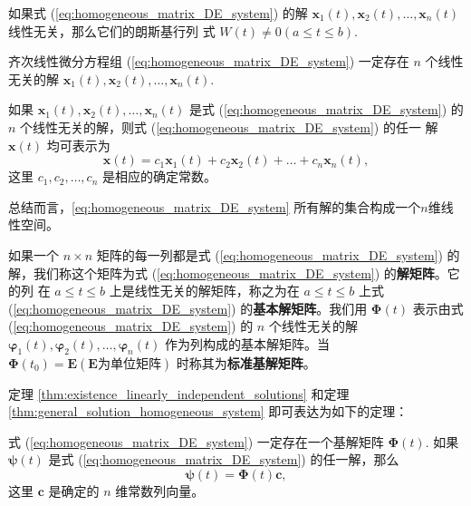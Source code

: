 \begin{theorem}[朗斯基行列式与向量函数线性无关性]\label{thm:Wronskian_linear_independence_vector}
如果式 (\ref{eq:homogeneous_matrix_DE_system}) 的解 $\mathbf{x}_1(t), \mathbf{x}_2(t), \dots, \mathbf{x}_n(t)$ 线性无关，那么它们的朗斯基行列
式 $W(t) \ne 0 (a \le t \le b)$.
\end{theorem}

\begin{theorem}[线性无关解的存在性]\label{thm:existence_linearly_independent_solutions}
齐次线性微分方程组 (\ref{eq:homogeneous_matrix_DE_system}) 一定存在 $n$ 个线性无关的解 $\mathbf{x}_1(t), \mathbf{x}_2(t), \dots,
\mathbf{x}_n(t)$.
\end{theorem}

\begin{theorem}[齐次方程组通解结构]\label{thm:general_solution_homogeneous_system}
如果 $\mathbf{x}_1(t), \mathbf{x}_2(t), \dots, \mathbf{x}_n(t)$ 是式 (\ref{eq:homogeneous_matrix_DE_system}) 的 $n$ 个线性无关的解，则式 (\ref{eq:homogeneous_matrix_DE_system}) 的任一
解 $\mathbf{x}(t)$ 均可表示为
$$\mathbf{x}(t) = c_1\mathbf{x}_1(t)+c_2\mathbf{x}_2(t)+\dots+c_n\mathbf{x}_n(t),$$
这里 $c_1, c_2, \dots, c_n$ 是相应的确定常数。
\end{theorem}
\begin{remark}
    总结而言，\eqref{eq:homogeneous_matrix_DE_system} 所有解的集合构成一个$n$维线性空间。
\end{remark}

\begin{definition}[解矩阵]\label{def:解矩阵}
    如果一个 $n \times n$ 矩阵的每一列都是式 (\ref{eq:homogeneous_matrix_DE_system}) 的解，我们称这个矩阵为式 (\ref{eq:homogeneous_matrix_DE_system}) 的\textbf{解矩阵}。它 的列
在 $a \le t \le b$ 上是线性无关的解矩阵，称之为在 $a \le t \le b$ 上式 (\ref{eq:homogeneous_matrix_DE_system}) 的\textbf{基本解矩阵}。我们用 $\boldsymbol{\Phi}(t)$
表示由式 (\ref{eq:homogeneous_matrix_DE_system}) 的 $n$ 个线性无关的解 $\boldsymbol{\varphi}_1(t), \boldsymbol{\varphi}_2(t), \dots, \boldsymbol{\varphi}_n(t)$ 作为列构成的基本解矩阵。当
$\boldsymbol{\Phi}(t_0) = \mathbf{E} (\mathbf{E} \text{为单位矩阵})$ 时称其为\textbf{标准基解矩阵}。
\end{definition}
定理 \ref{thm:existence_linearly_independent_solutions} 和定理 \ref{thm:general_solution_homogeneous_system} 即可表达为如下的定理：

\begin{theorem}[基解矩阵存在性]\label{thm:fundamental_matrix_solution}
    
式 (\ref{eq:homogeneous_matrix_DE_system}) 一定存在一个基解矩阵 $\boldsymbol{\Phi}(t)$. 如果 $\boldsymbol{\psi}(t)$ 是式 (\ref{eq:homogeneous_matrix_DE_system}) 的任一解，那么
\begin{equation}
\boldsymbol{\psi}(t) = \boldsymbol{\Phi}(t)\mathbf{c}, \label{eq:solution_using_fundamental_matrix}
\end{equation}
这里 $\mathbf{c}$ 是确定的 $n$ 维常数列向量。
\end{theorem}


